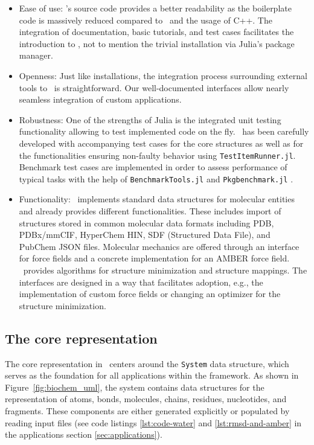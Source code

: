 \begin{itemize}
	\item Ease of use: \biochem's source code provides a better readability as the boilerplate code is massively reduced compared to \ball\ and the usage of C++. The integration of documentation, basic tutorials, and test cases facilitates the introduction to \biochem, not to mention the trivial installation via Julia's package manager. 
	
	\item Openness: Just like installations, the integration process surrounding external tools to \biochem\ is straightforward. Our well-documented interfaces allow nearly seamless integration of custom applications. 
	
	\item Robustness: One of the strengths of Julia is the integrated unit testing functionality allowing to test implemented code on the fly. \biochem\ has been carefully developed with accompanying test cases for the core structures as well as for the functionalities ensuring non-faulty behavior using \texttt{TestItemRunner.jl}\cite{TestItemRunner}. Benchmark test cases are implemented in order to assess performance of typical tasks with the help of \texttt{BenchmarkTools.jl} and \texttt{Pkgbenchmark.jl} \cite{BenchmarkTools.jl-2016, PkgBenchmark}. 
	
	\item Functionality: \biochem\ implements standard data structures for molecular entities and already provides different functionalities. These includes import of structures stored in common molecular data formats including PDB, PDBx/mmCIF, HyperChem HIN, SDF (Structured Data File), and PubChem JSON files. Molecular mechanics are offered through an interface for force fields and a concrete implementation for an AMBER force field. \biochem\ provides algorithms for structure minimization and structure mappings. The interfaces are designed in a way that facilitates adoption, e.g., the implementation of custom force fields or changing an optimizer for the structure minimization. 
\end{itemize}


\subsection{The core representation}

The core representation in \biochem\ centers around the \texttt{System} data structure, which serves as the foundation for all applications within the framework. As shown in Figure~\ref{fig:biochem_uml}, the system contains data structures for the representation of atoms, bonds, molecules, chains, residues, nucleotides, and fragments. These components are either generated explicitly or populated by reading input files (see code listings \ref{lst:code-water} and  \ref{lst:rmsd-and-amber} in the applications section \ref{sec:applications}). \\

